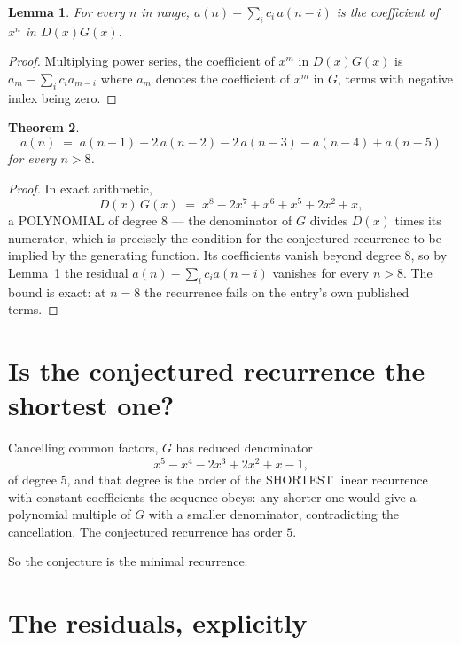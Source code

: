 \documentclass[11pt,a4paper]{article}
\theoremstyle{plain}
\newtheorem{theorem}{Theorem}
\newtheorem{lemma}[theorem]{Lemma}
\theoremstyle{definition}
\begin{document}
\begin{lemma}\label{lem:key}
For every $n$ in range, $a(n)-\sum_i c_i\,a(n-i)$ is the coefficient of $x^{n}$ in
$D(x)G(x)$.
\end{lemma}

\begin{proof}
Multiplying power series, the coefficient of $x^{m}$ in $D(x)G(x)$ is
$a_m-\sum_i c_i a_{m-i}$ where $a_m$ denotes the coefficient of $x^{m}$ in $G$, terms with
negative index being zero.
\end{proof}

\begin{theorem}
\[
a(n)\;=\;a(n-1) + 2\,a(n-2) - 2\,a(n-3) - a(n-4) + a(n-5)
\]
for every $n>8$.
\end{theorem}

\begin{proof}
In exact arithmetic,
\[
D(x)\,G(x)\;=\;x^{8} - 2 x^{7} + x^{6} + x^{5} + 2 x^{2} + x,
\]
a POLYNOMIAL of degree $8$ --- the denominator of $G$ divides $D(x)$ times its numerator,
which is precisely the condition for the conjectured recurrence to be implied by the
generating function. Its coefficients vanish beyond degree $8$, so by
Lemma~\ref{lem:key} the residual $a(n)-\sum_ic_ia(n-i)$ vanishes for every
$n>8$. The bound is exact: at $n=8$ the recurrence fails on the entry's own published terms.
\end{proof}

\section{Is the conjectured recurrence the shortest one?}

Cancelling common factors, $G$ has reduced denominator
\[
x^{5} - x^{4} - 2 x^{3} + 2 x^{2} + x - 1,
\]
of degree $5$, and that degree is the order of the SHORTEST linear recurrence with
constant coefficients the sequence obeys: any shorter one would give a polynomial multiple of
$G$ with a smaller denominator, contradicting the cancellation. The conjectured recurrence has
order $5$.

So the conjecture is the minimal recurrence.

\section{The residuals, explicitly}
\end{document}
